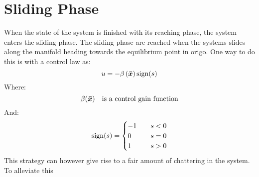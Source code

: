 \chapter{Sliding Phase}
When the state of the system is finished with its reaching phase, the system enters the sliding phase. The sliding phase are reached when the systems slides along the manifold heading towards the equilibrium point in origo. One way to do this is with a control law as:
\begin{equation}
  u = -\beta \left( \bm{\bar{x}} \right)\mathrm{sign}(s)
\end{equation}
Where:
\begin{equation}
  \beta (\bm{\bar{x}}) \quad\text{is a control gain function}
\nonumber
\end{equation}
And:
\begin{equation}
  \mathrm{sign}(s) =
  \begin{cases}
    -1 & \quad s < 0 \\
    0 & \quad s = 0 \\
    1 & \quad s > 0
  \end{cases}
\nonumber
\end{equation}
This strategy can however give rise to a fair amount of chattering in the system. To alleviate this 
